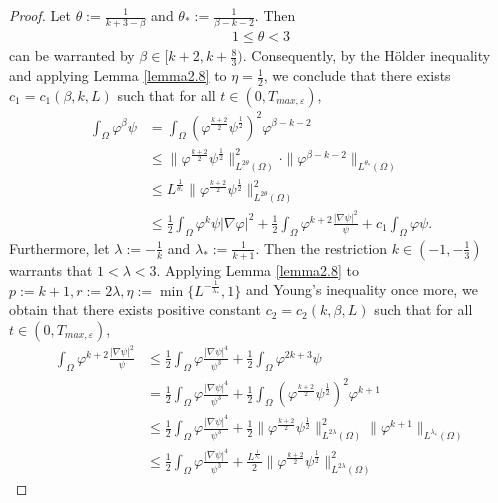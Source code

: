 \documentclass[12pt]{article}
\theoremstyle{plain}
\theoremstyle{definition}
\numberwithin{equation}{section}
\begin{document}
\begin{proof}
    Let
 $\theta:=\frac{1}{k+3-\beta}$ and $ \theta_*:=\frac{1}{\beta-k-2}.$
   Then  \begin{align}\label{3.11}
        1\leq\theta<3
    \end{align}
   can be warranted by $\beta \in [k+2,k+\frac{8}{3})$.
Consequently, by the H\"{o}lder inequality and applying  Lemma \ref{lemma2.8} to $\eta=\frac12$, we conclude that
there exists
$c_1=c_1(\beta,k,L)$ such that for all $t\in (0,T_{max,\varepsilon})$,
\begin{align}\label{3.12}
    \int_{\Omega}\varphi^{\beta}\psi
    &=\int_{\Omega}(\varphi^{\frac{k+2}{2}}\psi^{\frac{1}{2}})^2\varphi^{\beta-k-2} \nonumber
    \\
    &\leq\|\varphi^{\frac{k+2}{2}}\psi^{\frac{1}{2}}\|^2_{L^{2\theta}(\Omega)}\cdot\|\varphi^{\beta-k-2}\|_{L^{\theta_*}(\Omega)}\nonumber
    \\
    &\leq L^{\frac{1}{\theta_*}}\|\varphi^{\frac{k+2}{2}}\psi^{\frac{1}{2}}\|^2_{L^{2\theta}(\Omega)}\nonumber
    \\
    &\leq \frac{1}{2}\int_{\Omega}\varphi^{k}\psi|\nabla
    \varphi|^2+\frac{1}{2}
    \int_{\Omega}\varphi^{k+2}\frac{|\nabla
    \psi|^2}{\psi}+c_1\int_{\Omega}\varphi \psi.
\end{align}
Furthermore, let
$\lambda:=-\frac{1}{k}$ and $ \lambda_*:=\frac{1}{k+1}$. Then the restriction  $k\in(-1,-\frac{1}{3})$ warrants that
$     1<\lambda<3$.
 Applying Lemma \ref{lemma2.8} to $p:=k+1, r:=2\lambda, \eta:=\min\{L^{-\frac1{\lambda_*}},1\}$ and Young's inequality once more, we obtain that there
exists positive constant $c_2=c_2(k,\beta,L)$ such that for all $t\in (0,T_{max,\varepsilon})$,
\begin{align}\label{3.13}
    \int_{\Omega}\varphi^{k+2}\frac{|\nabla \psi|^2}{\psi}&\leq
    \frac{1}{2}\int_{\Omega}\varphi\frac{|\nabla
    \psi|^4}{\psi^3}+\frac1{2}\int_{\Omega}\varphi^{2k+3}\psi\nonumber
    \\
    &=\frac{1}{2}\int_{\Omega}\varphi\frac{|\nabla
    \psi|^4}{\psi^3}+\frac1{2}\int_{\Omega}(\varphi^{\frac{k+2}{2}}\psi^{\frac{1}{2}})^2\varphi^{k+1}\nonumber
    \\
    &\leq\frac{1}{2}\int_{\Omega}\varphi\frac{|\nabla
    \psi|^4}{\psi^3}+\frac1{2}\|\varphi^{\frac{k+2}{2}}\psi^{\frac{1}{2}}\|_{L^{2\lambda}(\Omega)}^2\|\varphi^{k+1}\|_{L^{\lambda_*}(\Omega)}\nonumber
    \\
    &\leq\frac{1}{2}\int_{\Omega}\varphi\frac{|\nabla
    \psi|^4}{\psi^3}+\frac{L^{\frac 1{ \lambda_* }}}{2}\|\varphi^{\frac{k+2}{2}}\psi^{\frac{1}{2}}\|_{L^{2\lambda}(\Omega)}^2\nonumber

\end{align}
\end{proof}
\end{document}
